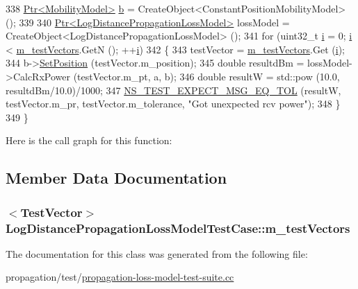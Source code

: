 \begin{DoxyCode}
338   \hyperlink{classns3_1_1Ptr}{Ptr<MobilityModel>} \hyperlink{buildings__pathloss_8m_a21ad0bd836b90d08f4cf640b4c298e7c}{b} = CreateObject<ConstantPositionMobilityModel> (); 
339 
340   \hyperlink{classns3_1_1Ptr}{Ptr<LogDistancePropagationLossModel>} lossModel = 
      CreateObject<LogDistancePropagationLossModel> (); 
341   \textcolor{keywordflow}{for} (uint32\_t \hyperlink{bernuolliDistribution_8m_a6f6ccfcf58b31cb6412107d9d5281426}{i} = 0; \hyperlink{bernuolliDistribution_8m_a6f6ccfcf58b31cb6412107d9d5281426}{i} < \hyperlink{classLogDistancePropagationLossModelTestCase_a2e7dbb82f128bd896a9fe5641cf08e8e}{m\_testVectors}.GetN (); ++\hyperlink{bernuolliDistribution_8m_a6f6ccfcf58b31cb6412107d9d5281426}{i})
342     \{
343       testVector = \hyperlink{classLogDistancePropagationLossModelTestCase_a2e7dbb82f128bd896a9fe5641cf08e8e}{m\_testVectors}.Get (\hyperlink{bernuolliDistribution_8m_a6f6ccfcf58b31cb6412107d9d5281426}{i});
344       b->\hyperlink{classns3_1_1MobilityModel_ac584b3d5a309709d2f13ed6ada1e7640}{SetPosition} (testVector.m\_position);
345       \textcolor{keywordtype}{double} resultdBm = lossModel->CalcRxPower (testVector.m\_pt, a, b);
346       \textcolor{keywordtype}{double} resultW = std::pow (10.0, resultdBm/10.0)/1000;
347       \hyperlink{group__testing_ga7927b376d1fed5e576c7a3d69d26e8a0}{NS\_TEST\_EXPECT\_MSG\_EQ\_TOL} (resultW, testVector.m\_pr, testVector.m\_tolerance,
       \textcolor{stringliteral}{"Got unexpected rcv power"});
348     \}
349 \}
\end{DoxyCode}


Here is the call graph for this function\+:




\subsection{Member Data Documentation}
\subsubsection[{\texorpdfstring{m\+\_\+test\+Vectors}{m_testVectors}}]{$<${\bf Test\+Vector}$>$ Log\+Distance\+Propagation\+Loss\+Model\+Test\+Case\+::m\+\_\+test\+Vectors\hspace{0.3cm}{\ttfamily [private]}}\hypertarget{classLogDistancePropagationLossModelTestCase_a2e7dbb82f128bd896a9fe5641cf08e8e}{}\label{classLogDistancePropagationLossModelTestCase_a2e7dbb82f128bd896a9fe5641cf08e8e}


The documentation for this class was generated from the following file\+:\begin{DoxyCompactItemize}
\item 
propagation/test/\hyperlink{propagation-loss-model-test-suite_8cc}{propagation-\/loss-\/model-\/test-\/suite.\+cc}\end{DoxyCompactItemize}
